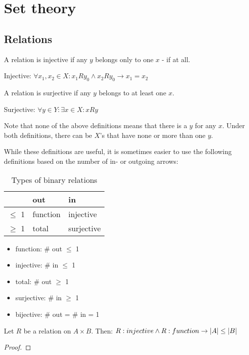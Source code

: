 \section{Set theory}

\subsection{Relations}

A relation is injective if any $y$ belongs only to one $x$ - if at all.
\begin{definition}
    Injective: $\forall x_1, x_2 \in X: x_1 R y_0 \land x_2 R y_0 \rightarrow x_1 = x_2$
\end{definition}

A relation is surjective if any $y$ belongs to at least one $x$.
\begin{definition}
    Surjective: $\forall y \in Y: \exists x \in X: x R y$
\end{definition}

Note that none of the above definitions means that there is a $y$ for any $x$. Under both definitions, there can be $X$'s that have none or more than one $y$. 

While these definitions are useful, it is sometimes easier to use the following definitions based on the number of in- or outgoing arrows:

\begin{table}[h]
\centering
\caption{Types of binary relations}
\begin{tabular}{@{}lll@{}}
\toprule
               & out      & in         \\ \midrule
$\leq$ 1       & function & injective  \\
$\geq$ 1       & total    & surjective \\ \bottomrule
\end{tabular}
\end{table}

\begin{itemize}
    \item function: \# out $\leq$ 1
    \item injective: \# in $\leq$ 1
    \item total: \# out $\geq$ 1
    \item surjective: \# in $\geq$ 1
    \item bijective: \# out = \# in = 1
\end{itemize}

\begin{theorem}
 Let $R$ be a relation on $ A \times B$. Then: 
 $ R:injective \land R:function \to  |A| \leq |B|$
\end{theorem}
\begin{proof}
\end{proof}

